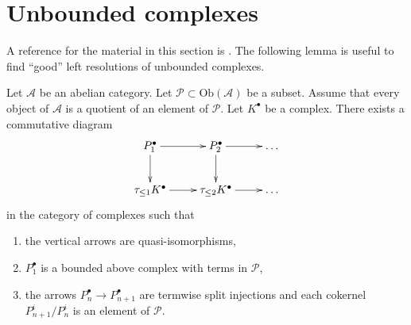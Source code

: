 \section{Unbounded complexes}
\label{section-unbounded}

\noindent
A reference for the material in this section is \cite{Spaltenstein}.
The following lemma is useful to find ``good'' left resolutions of
unbounded complexes.

\begin{lemma}
\label{lemma-special-direct-system}
Let $\mathcal{A}$ be an abelian category. Let
$\mathcal{P} \subset \text{Ob}(\mathcal{A})$ be a subset.
Assume that every object of $\mathcal{A}$ is a quotient of an
element of $\mathcal{P}$. Let $K^\bullet$ be a complex.
There exists a commutative diagram
$$
\xymatrix{
P_1^\bullet \ar[d] \ar[r] & P_2^\bullet \ar[d] \ar[r] & \ldots \\
\tau_{\leq 1}K^\bullet \ar[r] & \tau_{\leq 2}K^\bullet \ar[r] & \ldots
}
$$
in the category of complexes such that
\begin{enumerate}
\item the vertical arrows are quasi-isomorphisms,
\item $P_1^\bullet$ is a bounded above complex with terms in
$\mathcal{P}$,
\item the arrows $P_n^\bullet \to P_{n + 1}^\bullet$
are termwise split injections and each cokernel
$P^i_{n + 1}/P^i_n$ is an element of $\mathcal{P}$.
\end{enumerate}
\end{lemma}

